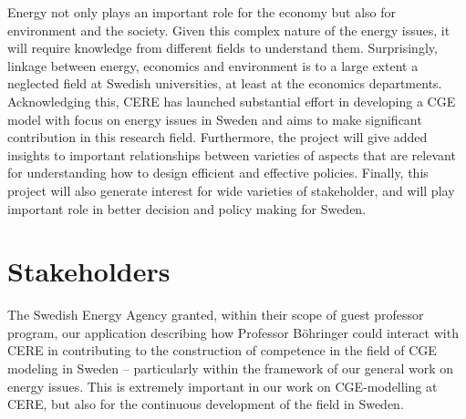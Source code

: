 Energy not only plays an important role for the economy but also for environment and the society. Given this complex nature of the energy issues, it will require knowledge from different fields to understand them.
Surprisingly, linkage between energy, economics and environment is to a large extent a neglected field at Swedish universities, at least at the economics departments. 
Acknowledging this, CERE has launched substantial effort in developing a CGE model with focus on energy issues in Sweden and aims to make significant contribution in this research field. 
Furthermore, the project will give added insights to important relationships between varieties of aspects that are relevant for understanding how to design efficient and effective policies. Finally, this project will also generate interest for wide varieties of stakeholder, and will play important role in better decision and policy making for Sweden.

\section{Stakeholders}
The Swedish Energy Agency granted, within their scope of guest professor program, our application describing how Professor Böhringer could interact with CERE in contributing to the construction of competence in the field of CGE modeling in Sweden – particularly within the framework of our general work on energy issues. This is extremely important in our work on CGE-modelling at CERE, but also for the continuous development of the field in Sweden.

